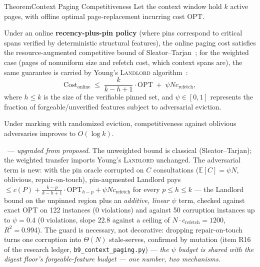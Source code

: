 \documentclass[11pt,a4paper]{article}
\theoremstyle{definition}
\theoremstyle{plain}
\begin{document}
\begin{pdclaim}{Theorem}{Context Paging Competitiveness}
\setlength{\parskip}{4pt plus 1pt}
\label{thm:paging}
Let the context window hold $k$ active pages, with offline optimal page-replacement incurring cost $\mathrm{OPT}$.

Under an online \textbf{recency-plus-pin policy} (where pins correspond to critical spans verified by deterministic structural features), the online paging cost satisfies the resource-augmented competitive bound of Sleator--Tarjan~; for the weighted case (pages of nonuniform size and refetch cost, which context spans are), the same guarantee is carried by Young's \textsc{Landlord} algorithm~:
\begin{equation}
\mathrm{Cost}_{\mathrm{online}} \;\le\; \frac{k}{k - h + 1} \cdot \mathrm{OPT} \;+\; \psi N c_{\mathrm{refetch}},
\end{equation}
where $h \le k$ is the size of the verifiable pinned set, and $\psi \in [0, 1]$ represents the fraction of forgeable/unverified features subject to adversarial eviction.

Under marking with randomized eviction, competitiveness against oblivious adversaries improves to $O(\log k)$.
\end{pdclaim}

\noindent\Verified\ --- \emph{upgraded from proposed}. The unweighted bound is classical
(Sleator--Tarjan); the weighted transfer imports Young's \textsc{Landlord} unchanged.
The adversarial term is new: with the pin oracle corrupted on $C$ consultations
($\mathbb{E}[C]=\psi N$, oblivious, repair-on-touch), pin-augmented Landlord pays
$\le c(P) + \tfrac{k-p}{k-h+1}\cdot\mathrm{OPT}_{h-p} + \psi N c_{\mathrm{refetch}}$ for
every $p\le h\le k$ --- the Landlord bound on the unpinned region plus an
\emph{additive, linear} $\psi$ term, checked against exact OPT on 122 instances (0
violations) and against 50 corruption instances up to $\psi=0.4$ (0 violations, slope
$22.8$ against a ceiling of $N\cdot c_{\mathrm{refetch}}=1200$, $R^2=0.994$). The guard
is necessary, not decorative: dropping repair-on-touch turns one corruption into
$\Theta(N)$ stale-serves, confirmed by mutation (item R16 of the research ledger,
\texttt{b9\_context\_paging.py}) --- \emph{the $\psi$ budget is shared with the digest
floor's forgeable-feature budget --- one number, two mechanisms}.
\end{document}
